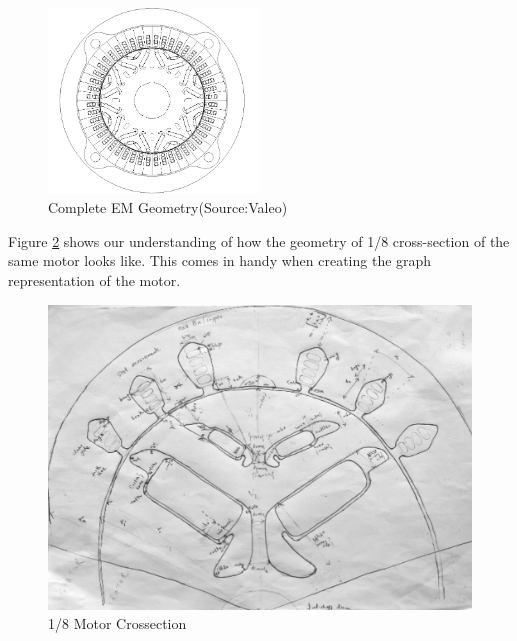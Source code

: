 \documentclass{report} %
\begin{document}
\begin{figure}[H]
    \centering
    \includegraphics[width=0.5\textwidth]{./ReportImages/FullMotorv2.png} 
    \caption{Complete EM Geometry(Source:Valeo)}
    \label{fig:Full Motor}
\end{figure}

Figure \ref{fig:1/8 Motor Crossection} shows our understanding of how the geometry of 1/8 cross-section of the same motor looks like.
This comes in handy when creating the graph representation of the motor.\\

\begin{figure}[H]
    \centering
    \includegraphics[width=1\textwidth]{./ReportImages/EMCrosssectionFiltered.png} 
    \caption{1/8 Motor Crossection}
    \label{fig:1/8 Motor Crossection}
\end{figure}

\newpage 
\end{document}
